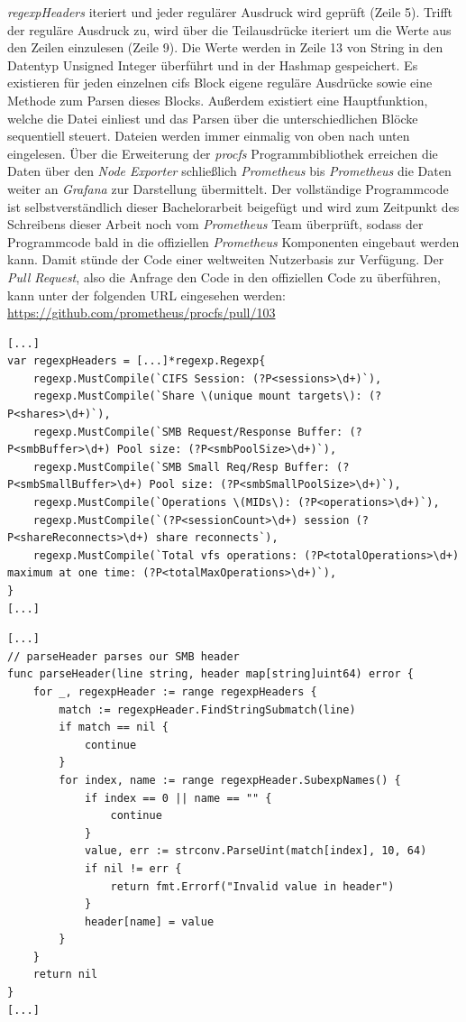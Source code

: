 \documentclass[titlepage]{report}
\begin{document}
\emph{regexpHeaders} iteriert und jeder regulärer Ausdruck wird geprüft
(Zeile 5). Trifft der reguläre Ausdruck zu, wird über die Teilausdrücke
iteriert um die Werte aus den Zeilen einzulesen (Zeile 9). Die Werte
werden in Zeile 13 von String in den Datentyp Unsigned Integer
überführt und in der Hashmap gespeichert. Es existieren für jeden
einzelnen \gls{cifs} Block eigene reguläre Ausdrücke sowie eine Methode
zum Parsen dieses Blocks. Außerdem existiert eine Hauptfunktion, welche
die Datei einliest und das Parsen über die unterschiedlichen Blöcke
sequentiell steuert. Dateien werden immer einmalig von oben nach unten
eingelesen. Über die Erweiterung der \emph{procfs} Programmbibliothek
erreichen die Daten über den \emph{Node Exporter} schließlich
\emph{Prometheus} bis \emph{Prometheus} die Daten weiter an
\emph{Grafana} zur Darstellung übermittelt. Der vollständige
Programmcode ist selbstverständlich dieser Bachelorarbeit beigefügt und
wird zum Zeitpunkt des Schreibens dieser Arbeit noch vom
\emph{Prometheus} Team überprüft, sodass der Programmcode bald
in die offiziellen \emph{Prometheus} Komponenten eingebaut werden kann.
Damit stünde der Code einer weltweiten Nutzerbasis zur Verfügung. Der
\emph{Pull Request}\cite{PRGITHUB}, also die Anfrage den Code in den
offiziellen Code zu überführen, kann unter der folgenden URL eingesehen
werden: \url{https://github.com/prometheus/procfs/pull/103}
\begin{minipage}{\linewidth}
\begin{lstlisting}[caption={Nicht vollständiger Auszug aus der Datei
cifs.go},label={lst:parserregex}]
[...]
var regexpHeaders = [...]*regexp.Regexp{
	regexp.MustCompile(`CIFS Session: (?P<sessions>\d+)`),
	regexp.MustCompile(`Share \(unique mount targets\): (?P<shares>\d+)`),
	regexp.MustCompile(`SMB Request/Response Buffer: (?P<smbBuffer>\d+) Pool size: (?P<smbPoolSize>\d+)`),
	regexp.MustCompile(`SMB Small Req/Resp Buffer: (?P<smbSmallBuffer>\d+) Pool size: (?P<smbSmallPoolSize>\d+)`),
	regexp.MustCompile(`Operations \(MIDs\): (?P<operations>\d+)`),
	regexp.MustCompile(`(?P<sessionCount>\d+) session (?P<shareReconnects>\d+) share reconnects`),
	regexp.MustCompile(`Total vfs operations: (?P<totalOperations>\d+) maximum at one time: (?P<totalMaxOperations>\d+)`),
}
[...]
\end{lstlisting}
\end{minipage}
\begin{minipage}{\linewidth}
\begin{lstlisting}[caption={Nicht vollständiger Auszug aus der Datei
cifs\_parse.go},label={lst:parserheader}]
[...]
// parseHeader parses our SMB header
func parseHeader(line string, header map[string]uint64) error {
	for _, regexpHeader := range regexpHeaders {
		match := regexpHeader.FindStringSubmatch(line)
		if match == nil {
			continue
		}
		for index, name := range regexpHeader.SubexpNames() {
			if index == 0 || name == "" {
				continue
			}
			value, err := strconv.ParseUint(match[index], 10, 64)
			if nil != err {
				return fmt.Errorf("Invalid value in header")
			}
			header[name] = value
		}
	}
	return nil
}
[...]
\end{lstlisting}
\end{minipage}
\end{document}

